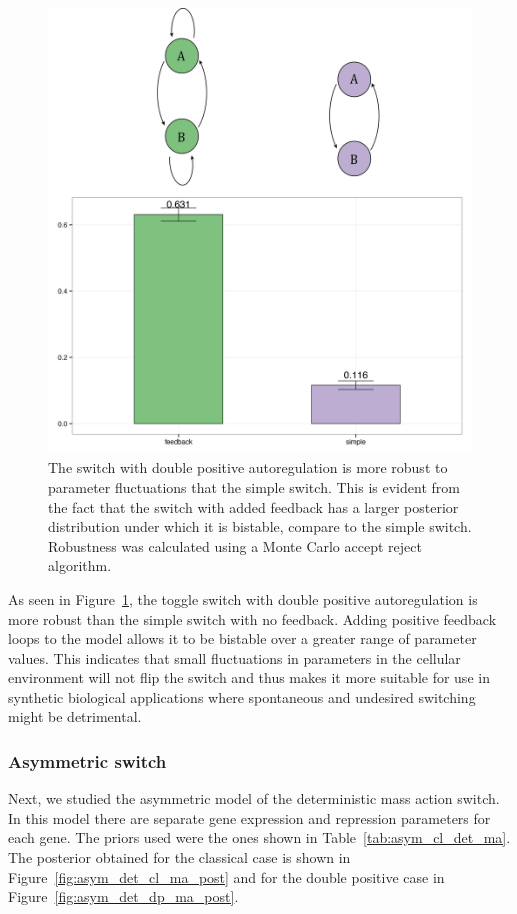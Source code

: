 \begin{figure}[h]
\centering
\includegraphics[scale=0.5]{chapterStabilityFinder/mass_action_switches/deterministic/MA_robustness_cartoon.png}
\caption[The robustness of the double positive and the simple switch mass action models]{The switch with double positive autoregulation is more robust to parameter fluctuations that the simple switch. This is evident from the fact that the switch with added feedback has a larger posterior distribution under which it is bistable, compare to the simple switch. Robustness was calculated using a Monte Carlo accept reject algorithm. }
\label{fig:robust_std_doubpos}
\end{figure}
As seen in Figure~\ref{fig:robust_std_doubpos}, the toggle switch with double positive autoregulation is more robust than the simple switch with no feedback. Adding positive feedback loops to the model allows it to be bistable over a greater range of parameter values. This indicates that small fluctuations in parameters in the cellular environment will not flip the switch and thus makes it more suitable for use in synthetic biological applications where spontaneous and undesired switching might be detrimental. 
\clearpage

\subsubsection{Asymmetric switch}
Next, we studied the asymmetric model of the deterministic mass action switch. In this model there are separate gene expression and repression parameters for each gene. The priors used were the ones shown in Table~\ref{tab:asym_cl_det_ma}. The posterior obtained for the classical case is shown in Figure~\ref{fig:asym_det_cl_ma_post} and for the double positive case in Figure~\ref{fig:asym_det_dp_ma_post}.

